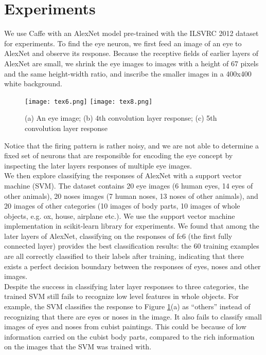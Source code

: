\documentclass[11pt]{article}
\begin{document}
\section{Experiments}
We use Caffe with an AlexNet model pre-trained with the ILSVRC 2012 dataset for experiments. To find the eye neuron, we first feed an image of an eye to AlexNet and observe its response. Because the receptive fields of earlier layers of AlexNet are small, we shrink the eye images to images with a height of 67 pixels and the same height-width ratio, and inscribe the smaller images in a 400x400 white background.\\

\begin{figure}[h]
    \centering
    \texttt{[image: tex6.png]}
    \texttt{[image: tex8.png]}
    \caption{(a) An eye image; (b) 4th convolution layer response; (c) 5th convolution layer response}
    \label{fig:cubist}
\end{figure}

Notice that the firing pattern is rather noisy, and we are not able to determine a fixed set of neurons that are responsible for encoding the eye concept by inspecting the later layers responses of multiple eye images.\\

We then explore classifying the responses of AlexNet with a support vector machine (SVM). The dataset contains 20 eye images (6 human eyes, 14 eyes of other animals), 20 noses images (7 human noses, 13 noses of other animals), and 20 images of other categories (10 images of body parts, 10 images of whole objects, e.g. ox, house, airplane etc.). We use the support vector machine implementation in scikit-learn library for experiments. We found that among the later layers of AlexNet, classifying on the responses of fc6 (the first fully connected layer) provides the best classification results: the 60 training examples are all correctly classified to their labels after training, indicating that there exists a perfect decision boundary between the responses of eyes, noses and other images.\\

Despite the success in classifying later layer responses to three categories, the trained SVM still fails to recognize low level features in whole objects. For example, the SVM classifies the response to Figure \ref{fig:cubist}(a) as ``others'' instead of recognizing that there are eyes or noses in the image. It also fails to classify small images of eyes and noses from cubist paintings. This could be because of low information carried on the cubist body parts, compared to the rich information on the images that the SVM was trained with.\\
\end{document}
